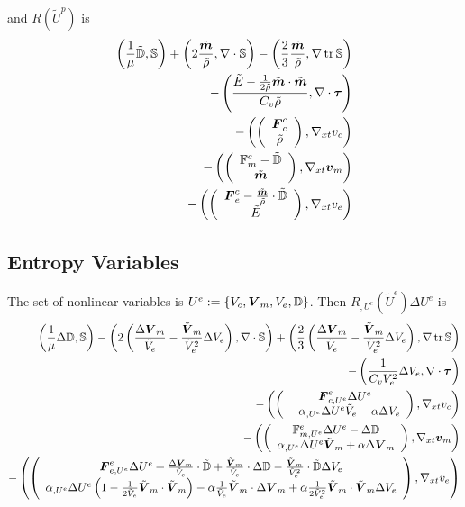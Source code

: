 \documentclass{article}
\begin{document}
and $R(\tilde U^p)$ is
\begin{align*}
	\left( \frac{1}{\mu}\tilde{\mathbb{D}},\mathbb{S} \right)+\left( 2\frac{\tilde{\boldsymbol m}}{\tilde\rho},\nabla\cdot\mathbb{S} \right)
	-\left( \frac{2}{3}\frac{\tilde{\boldsymbol m}}{\tilde\rho},\nabla\operatorname*{tr}{\mathbb{S}} \right)\\
	-\left( \frac{\tilde E-\frac{1}{2\tilde\rho}\tilde{\boldsymbol m}\cdot\tilde{\boldsymbol m}}{C_v\tilde\rho},\nabla\cdot\boldsymbol\tau \right)\\
	-\left( \left( \begin{array}{c} \boldsymbol F^c_c\\ \tilde\rho\\ \end{array} \right),\nabla_{xt} v_c \right)\\
	-\left( \left( \begin{array}{c} \mathbb{F}^c_m-\tilde{\mathbb{D}}\\ \tilde{\boldsymbol m}\\ \end{array} \right),\nabla_{xt}\boldsymbol v_m \right)\\
	-\left( \left( \begin{array}{c} \boldsymbol F^c_e-\frac{\tilde{\boldsymbol m}}{\tilde\rho}\cdot\tilde{\mathbb{D}}\\ \tilde E\\ \end{array} \right),\nabla_{xt} v_e \right)
\end{align*}

\subsection*{Entropy Variables}
The set of nonlinear variables is $U^e:=\left\{ V_c,\boldsymbol V_m,V_e,\mathbb{D} \right\}$.
Then $R_{,U^e}(\tilde U^e)\Delta U^e$ is
\begin{align*}
	\left( \frac{1}{\mu}\Delta\mathbb{D},\mathbb{S} \right)
	-\left( 2\left( \frac{\Delta\boldsymbol V_m}{\tilde V_e}-\frac{\tilde{\boldsymbol V}_m}{\tilde V_e^2}\Delta V_e \right),\nabla\cdot\mathbb{S} \right)
	+\left( \frac{2}{3}\left( \frac{\Delta\boldsymbol V_m}{\tilde V_e}-\frac{\tilde{\boldsymbol V}_m}{\tilde V_e^2}\Delta V_e \right),\nabla\operatorname*{tr}{\mathbb{S}} \right)\\
	-\left( \frac{1}{C_vV_e^2}\Delta V_e,\nabla\cdot\boldsymbol\tau \right)\\
	-\left( \left( \begin{array}{c} \boldsymbol F^e_{c,U^e}\Delta U^e\\ -\alpha_{,U^e}\Delta U^e \tilde V_e-\alpha\Delta V_e\\ \end{array} \right),\nabla_{xt} v_c \right)\\
	-\left( \left( \begin{array}{c} \mathbb{F}^e_{m,U^e}\Delta U^e-\Delta\mathbb{D}\\ \alpha_{,U^e}\Delta U^e\tilde{\boldsymbol V}_m+\alpha\Delta\boldsymbol V_m\\ \end{array} \right),\nabla_{xt}\boldsymbol v_m \right)\\
	-\left( \left( \begin{array}{c} \boldsymbol F^e_{e,U^e}\Delta U^e
	+\frac{\Delta\boldsymbol V_m}{\tilde V_e}\cdot\tilde{\mathbb{D}}
	+\frac{\tilde{\boldsymbol V}_m}{\tilde V_e}\cdot\Delta{\mathbb{D}}
	-\frac{\tilde{\boldsymbol V}_m}{\tilde V_e^2}\cdot\tilde{\mathbb{D}}\Delta V_e
	\\ \alpha_{,U^e}\Delta U^e\left( 1-\frac{1}{2\tilde V_e}\tilde{\boldsymbol V}_m\cdot\tilde{\boldsymbol V}_m \right)
	-\alpha\frac{1}{\tilde V_e}\tilde{\boldsymbol V}_m\cdot\Delta\boldsymbol V_m
	+\alpha\frac{1}{2\tilde V_e^2}\tilde{\boldsymbol V}_m\cdot\tilde{\boldsymbol V}_m\Delta V_e
	\\ \end{array} \right),\nabla_{xt} v_e \right)
\end{align*}
\end{document}
